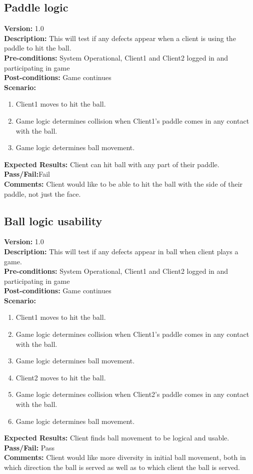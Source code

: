 \documentclass[12pt]{article}
\begin{document}
    \subsection{Paddle logic}
    \textbf{Version:} 1.0\\
    \textbf{Description:} This will test if any defects appear when a client is using the paddle to hit the ball.\\
    \textbf{Pre-conditions:} System Operational, Client1 and Client2 logged in and participating in game \\
    \textbf{Post-conditions:} Game continues\\
    \textbf{Scenario:}
    \begin{enumerate}
        \item Client1 moves to hit the ball.
        \item Game logic determines collision when Client1's paddle comes in any contact with the ball. 
        \item Game logic determines ball movement.
    \end{enumerate}
    \textbf{Expected Results:} Client can hit ball with any part of their paddle.\\
    \textbf{Pass/Fail:}Fail\\
    \textbf{Comments:} Client would like to be able to hit the ball with the side of their paddle, not just the face.\\

    \subsection{Ball logic usability}
    \textbf{Version:} 1.0\\
    \textbf{Description:} This will test if any defects appear in ball when client plays a game.\\
    \textbf{Pre-conditions:} System Operational, Client1 and Client2 logged in and participating in game \\
    \textbf{Post-conditions:} Game continues\\
    \textbf{Scenario:}
    \begin{enumerate}
        \item Client1 moves to hit the ball.
        \item Game logic determines collision when Client1's paddle comes in any contact with the ball. 
        \item Game logic determines ball movement.
        \item Client2 moves to hit the ball.
        \item Game logic determines collision when Client2's paddle comes in any contact with the ball. 
        \item Game logic determines ball movement.
    \end{enumerate}
    \textbf{Expected Results:} Client finds ball movement to be logical and usable.\\
    \textbf{Pass/Fail:} Pass\\
    \textbf{Comments:} Client would like more diversity in initial ball movement, both in which direction the ball is served as well as to which client the ball is served.\\
\end{document}
